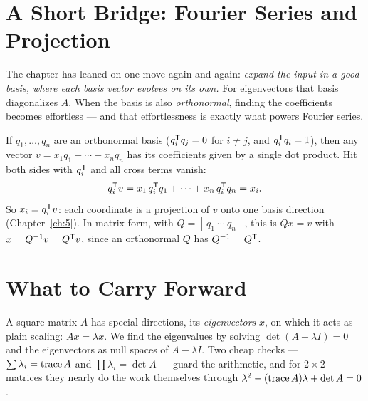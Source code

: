 \section{A Short Bridge: Fourier Series and Projection}

The chapter has leaned on one move again and again: \emph{expand the input in a good basis, where each basis vector evolves on its own.} For eigenvectors that basis diagonalizes $A$. When the basis is also \emph{orthonormal}, finding the coefficients becomes effortless --- and that effortlessness is exactly what powers Fourier series.

If $q_1,\dots,q_n$ are an orthonormal basis ($q_i^{\mathsf T} q_j=0$ for $i\ne j$, and $q_i^{\mathsf T} q_i=1$), then any vector $v=x_1 q_1+\cdots+x_n q_n$ has its coefficients given by a single dot product. Hit both sides with $q_i^{\mathsf T}$ and all cross terms vanish:
\[
   q_i^{\mathsf T} v = x_1\,q_i^{\mathsf T} q_1+\cdots+x_n\,q_i^{\mathsf T} q_n = x_i .
\]
So $x_i=q_i^{\mathsf T} v$: each coordinate is a projection of $v$ onto one basis direction (Chapter~\ref{ch:5}). In matrix form, with $Q=[\,q_1\ \cdots\ q_n\,]$, this is $Qx=v$ with $x=Q^{-1}v=Q^{\mathsf T} v$, since an orthonormal $Q$ has $Q^{-1}=Q^{\mathsf T}$.


\section{What to Carry Forward}

A square matrix $A$ has special directions, its \emph{eigenvectors} $x$, on which it acts as plain scaling: $Ax=\lambda x$. We find the eigenvalues by solving $\det(A-\lambda I)=0$ and the eigenvectors as null spaces of $A-\lambda I$. Two cheap checks --- $\sum\lambda_i=\operatorname{trace} A$ and $\prod\lambda_i=\det A$ --- guard the arithmetic, and for $2\times2$ matrices they nearly do the work themselves through $\lambda^2-(\operatorname{trace} A)\lambda+\det A=0$.


